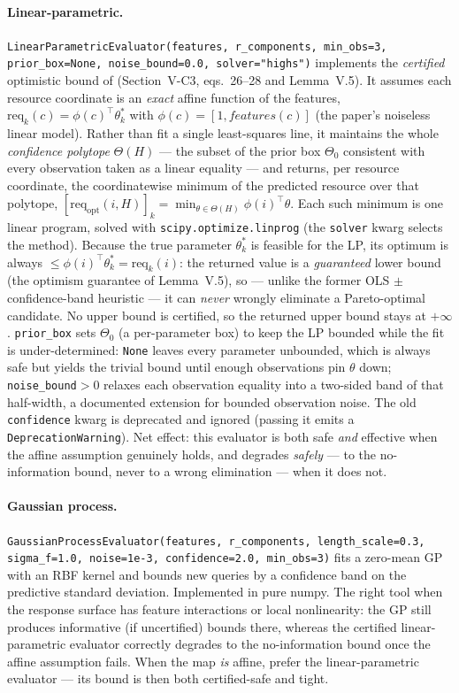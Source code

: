 \documentclass[11pt,a4paper]{article}
\begin{document}
\paragraph{Linear-parametric.}
\texttt{LinearParametricEvaluator(features, r\_components,
min\_obs=3, prior\_box=None, noise\_bound=0.0, solver="highs")}
implements the \emph{certified} optimistic bound of
\citet{alharbi2026online} (Section~V-C3, eqs.\ 26--28 and Lemma~V.5).
It assumes each resource
coordinate is an \emph{exact} affine function of the features,
$\text{req}_k(c) = \phi(c)^\top \theta_k^*$ with
$\phi(c) = [1, features(c)]$ (the paper's noiseless linear model).
Rather than fit a single least-squares line, it maintains the whole
\emph{confidence polytope} $\Theta(H)$ --- the subset of the prior
box $\Theta_0$ consistent with every observation taken as a linear
equality --- and returns, per resource coordinate, the coordinatewise
minimum of the predicted resource over that polytope,
$[\text{req}_\text{opt}(i, H)]_k =
\min_{\theta \in \Theta(H)} \phi(i)^\top \theta$. Each such minimum is
one linear program, solved with \texttt{scipy.optimize.linprog} (the
\texttt{solver} kwarg selects the method). Because the true parameter
$\theta_k^*$ is feasible for the LP, its optimum is always
$\leq \phi(i)^\top \theta_k^* = \text{req}_k(i)$: the returned value is
a \emph{guaranteed} lower bound (the optimism guarantee of
Lemma~V.5), so --- unlike the former OLS $\pm$ confidence-band
heuristic --- it can \emph{never} wrongly eliminate a Pareto-optimal
candidate. No upper bound is certified, so the returned upper bound
stays at $+\infty$. \texttt{prior\_box} sets $\Theta_0$ (a per-parameter
box) to keep the LP bounded while the fit is under-determined:
\texttt{None} leaves every parameter unbounded, which is always safe
but yields the trivial bound until enough observations pin $\theta$
down; \texttt{noise\_bound}${} > 0$ relaxes each observation equality
into a two-sided band of that half-width, a documented extension for
bounded observation noise. The old \texttt{confidence} kwarg is
deprecated and ignored (passing it emits a
\texttt{DeprecationWarning}). Net effect: this evaluator is both safe
\emph{and} effective when the affine assumption genuinely holds, and
degrades \emph{safely} --- to the no-information bound, never to a
wrong elimination --- when it does not.

\paragraph{Gaussian process.}
\texttt{GaussianProcessEvaluator(features, r\_components,
length\_scale=0.3, sigma\_f=1.0, noise=1e-3, confidence=2.0,
min\_obs=3)} fits a zero-mean GP with an RBF kernel and bounds new
queries by a confidence band on the predictive standard deviation.
Implemented in pure numpy. The right tool when the response surface
has feature interactions or local nonlinearity: the GP still produces
informative (if uncertified) bounds there, whereas the certified
linear-parametric evaluator correctly degrades to the no-information
bound once the affine assumption fails. When the map \emph{is} affine,
prefer the linear-parametric evaluator --- its bound is then both
certified-safe and tight.
\end{document}
